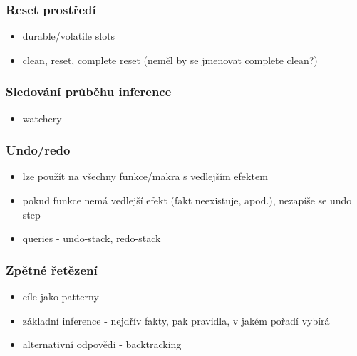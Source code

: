




\subsubsection{Reset prostředí}
\begin{framed}
  \begin{itemize}
    \item durable/volatile slots
    \item clean, reset, complete reset (neměl by se jmenovat complete clean?)
  \end{itemize}
\end{framed}

\subsubsection{Sledování průběhu inference}
\label{inference tracing}
\begin{framed}
  \begin{itemize}
    \item watchery
  \end{itemize}
\end{framed}

\subsubsection{Undo/redo}
\begin{framed}
  \begin{itemize}
    \item lze použít na všechny funkce/makra s vedlejším efektem
    \item pokud funkce nemá vedlejší efekt (fakt neexistuje, apod.), nezapíše se
      undo step
    \item queries - undo-stack, redo-stack
  \end{itemize}
\end{framed}

\subsubsection{Zpětné řetězení}
\begin{framed}
  \begin{itemize}
    \item cíle jako patterny
    \item základní inference - nejdřív fakty, pak pravidla, v jakém pořadí
      vybírá
    \item alternativní odpovědi - backtracking
  \end{itemize}
\end{framed}

